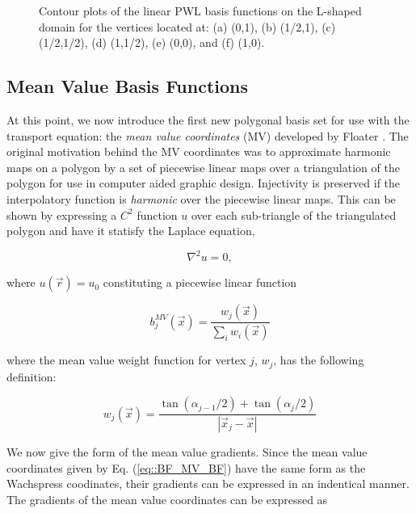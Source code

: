 \begin{figure}
\begin{subfigure}[b]{0.39\textwidth}
		\caption{}
	\end{subfigure}
\caption{Contour plots of the linear PWL basis functions on the L-shaped domain for the vertices located at: (a) (0,1), (b) (1/2,1), (c) (1/2,1/2), (d) (1,1/2), (e) (0,0), and (f) (1,0).}
\label{fig::2D_PWLD1_Ldom_basis_functions}
\end{figure}





\subsection{Mean Value Basis Functions}
\label{sec::BF_2DLinear_MV}

At this point, we now introduce the first new polygonal basis set for use with the transport equation: the {\em mean value coordinates} (MV) developed by Floater \cite{floater2003mean,hormann2006mean}. The original motivation behind the MV coordinates was to approximate harmonic maps on a polygon by a set of piecewise linear maps over a triangulation of the polygon for use in computer aided graphic design. Injectivity is preserved if the interpolatory function is {\em harmonic} over the piecewise linear maps. This can be shown by expressing a $C^2$ function $u$ over each sub-triangle of the triangulated polygon and have it statisfy the Laplace equation,

\begin{equation}
\label{eq::BF_MV_laplace}
\nabla^2 u = 0 ,
\end{equation}

\noindent where $u(\vec{r}) = u_0$ constituting a piecewise linear function 

\begin{equation}
\label{eq::BF_MV_BF}
b_{j}^{MV} (\vec{x}) = \frac{w_j (\vec{x}) }{\sum_i w_i (\vec{x})}
\end{equation}

\noindent where the mean value weight function for vertex $j$, $w_j$, has the following definition:

\begin{equation}
\label{eq::BF_MV_weights}
w_j (\vec{x})  = \frac{\tan(\alpha_{j-1} / 2) + \tan(\alpha_j / 2)}{|\vec{x}_j - \vec{x}|}
\end{equation}

We now give the form of the mean value gradients. Since the mean value coordinates given by Eq. (\ref{eq::BF_MV_BF}) have the same form as the Wachspress coodinates, their gradients can be expressed in an indentical manner. The gradients of the mean value coordinates can be expressed as

